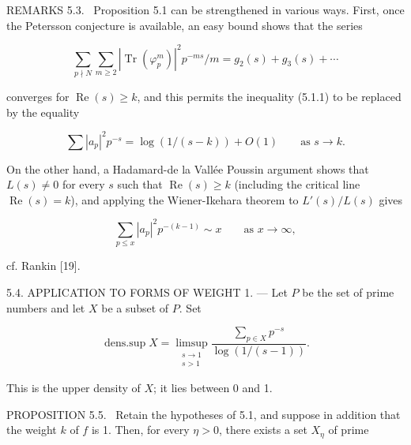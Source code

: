 \documentclass[10pt,oneside]{article}
\begin{document}
\noindent\textsc{REMARKS 5.3.} \textemdash\ Proposition 5.1 can be strengthened in various ways. First, once the Petersson conjecture is available, an easy bound shows that the series\par

\begin{equation*}
\sum_{p\nmid N}\sum_{m\geq2}|\operatorname{Tr}(\varphi_p^m)|^2p^{-ms}/m
=g_2(s)+g_3(s)+\cdots
\end{equation*}

converges for \(\operatorname{Re}(s)\geq k\), and this permits the inequality (5.1.1) to be replaced by the equality\par

\begin{equation*}
\tag{5.3.1}
\sum|a_p|^2p^{-s}=\log(1/(s-k))+O(1)
\qquad\text{as }s\longrightarrow k.
\end{equation*}

On the other hand, a Hadamard-de la Vallée Poussin argument shows that \(L(s)\neq0\) for every \(s\) such that \(\operatorname{Re}(s)\geq k\) (including the critical line \(\operatorname{Re}(s)=k\)), and applying the Wiener-Ikehara theorem to \(L'(s)/L(s)\) gives\par

\begin{equation*}
\tag{5.3.2}
\sum_{p\leq x}|a_p|^2p^{-(k-1)}\sim x
\qquad\text{as }x\longrightarrow\infty,
\end{equation*}

cf. Rankin [19].\par

5.4. APPLICATION TO FORMS OF WEIGHT 1. — Let \(P\) be the set of prime numbers and let \(X\) be a subset of \(P\). Set\par

\begin{equation*}
\tag{5.4.1}
\operatorname{dens.sup}X=
\limsup_{\substack{s\to1\\s>1}}
\frac{\sum_{p\in X}p^{-s}}{\log(1/(s-1))}.
\end{equation*}

This is the upper density of \(X\); it lies between 0 and 1.\par

\noindent\textsc{PROPOSITION 5.5.} \textemdash\ Retain the hypotheses of 5.1, and suppose in addition that the weight \(k\) of \(f\) is 1. Then, for every \(\eta>0\), there exists a set \(X_\eta\) of prime\par
\end{document}
